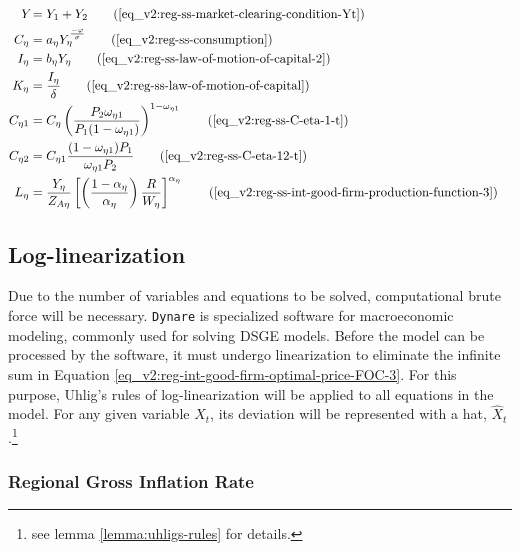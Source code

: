 \documentclass[../thesis.tex]{subfiles}
\begin{document}
\begin{align}
		\\
		Y_{} &= Y_{1} + Y_{2} \tag{\ref{eq_v2:reg-ss-market-clearing-condition-Yt}} 
		\\
		C_{\eta} &= a_{\eta} Y_{\eta}^{\frac{-\varphi}{\sigma}} \tag{\ref{eq_v2:reg-ss-consumption}}
		\\
		I_{\eta} &= b_{\eta} Y_{\eta} \tag{\ref{eq_v2:reg-ss-law-of-motion-of-capital-2}}
		\\
		K_{\eta} &= \frac{I_{\eta}}{\delta} \tag{\ref{eq_v2:reg-ss-law-of-motion-of-capital}}
		\\
		C_{\eta 1} &= C_{\eta} \left( \frac{P_{2} \omega_{\eta 1}}{P_{1} (1 - \omega_{\eta 1})} \right)^{1-\omega_{\eta 1}} \tag{\ref{eq_v2:reg-ss-C-eta-1-t}} 
		\\
		C_{\eta 2} &= C_{\eta 1} \frac{(1 - \omega_{\eta 1}) P_{1}}{\omega_{\eta 1} P_{2}} \tag{\ref{eq_v2:reg-ss-C-eta-12-t}} 
		\\
		L_{\eta} &= \frac{Y_{\eta}}{Z_{A\eta}} \left[ \left( \frac{1-\alpha_{\eta}}{{\alpha_{\eta}}} \right) \frac{R}{W_{\eta}} \right]^{\alpha_{\eta}} \tag{\ref{eq_v2:reg-ss-int-good-firm-production-function-3}}
	\end{align}

	\newpage
	
	
\subsection{Log-linearization}
	
Due to the number of variables and equations to be solved, computational brute force will be necessary. \texttt{Dynare} is specialized software for macroeconomic modeling, commonly used for solving DSGE models. Before the model can be processed by the software, it must undergo linearization to eliminate the infinite sum in Equation \ref{eq_v2:reg-int-good-firm-optimal-price-FOC-3}. For this purpose, Uhlig's rules of log-linearization \cite{uhlig_toolkit_1999} will be applied to all equations in the model. For any given variable $X_{t}$, its deviation will be represented with a hat, $\hat{X}_{t}$.\footnote{see lemma \ref{lemma:uhligs-rules} for details.}


\subsubsection*{Regional Gross Inflation Rate}
\end{document}
